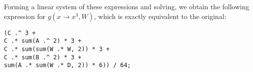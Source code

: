 %
Forming a linear system of these expressions and solving, we obtain
the following expression for $g(x \rightarrow x^3, W)$, which is
exactly equivalent to the original:
\vspace{-0.3cm}
\begin{lstlisting}
(C .^ 3 + 
C .* sum(A .^ 2) * 3 +
C .* sum(sum(W .* W, 2)) * 3 +
C .* sum(B .^ 2) * 3 + 
sum(A .* sum(W .* D, 2)) * 6)) / 64;
\end{lstlisting}

